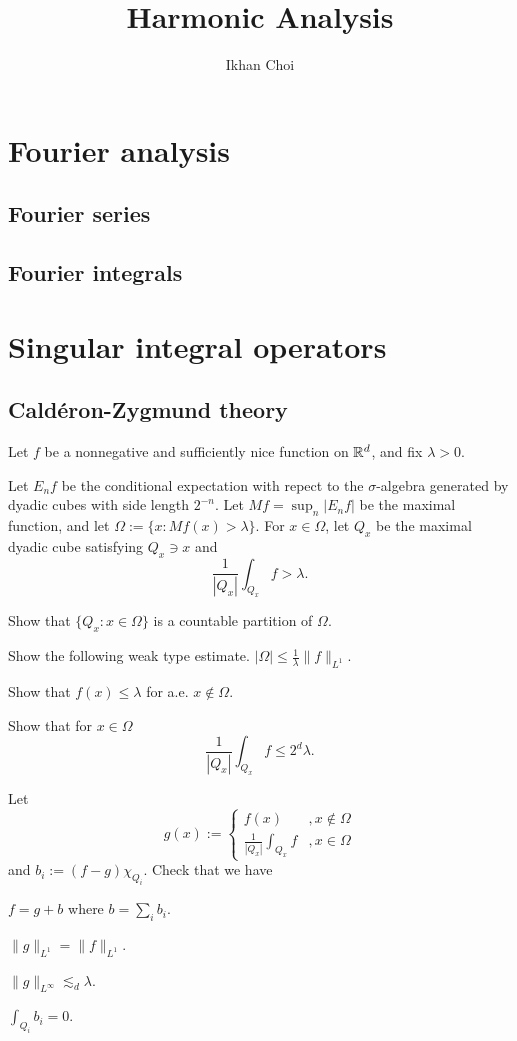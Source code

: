 \documentclass{../note}
\begin{document}
\title{Harmonic Analysis}
\author{Ikhan Choi}
\maketitle
\tableofcontents

\part{Fourier analysis}
\chapter{Fourier series}
\chapter{Fourier integrals}


\part{Singular integral operators}
\chapter{Cald\'eron-Zygmund theory}

Let $f$ be a nonnegative and sufficiently nice function on $\mathbb{R}^d$, and fix $\lambda>0$.

\begin{prb}
Let $E_nf$ be the conditional expectation with repect to the $\sigma$-algebra generated by dyadic cubes with side length $2^{-n}$.
Let $Mf=\sup_n|E_nf|$ be the maximal function, and let $\Omega:=\{x:Mf(x)>\lambda\}$.
For $x\in\Omega$, let $Q_x$ be the maximal dyadic cube satisfying $Q_x\ni x$ and
\[\frac1{|Q_x|}\int_{Q_x}f>\lambda.\]
\begin{parts}
\item
Show that $\{Q_x:x\in\Omega\}$ is a countable partition of $\Omega$.
\item
Show the following weak type estimate. $|\Omega|\le\frac1\lambda\|f\|_{L^1}$.
\item
Show that $f(x)\le\lambda$ for a.e. $x\notin\Omega$.
\item
Show that for $x\in\Omega$
\[\frac1{|Q_x|}\int_{Q_x}f\le2^d\lambda.\]
\end{parts}
\end{prb}

\begin{prb}
Let
\[g(x):=\begin{cases}f(x)&,x\notin\Omega\\\frac1{|Q_x|}\int_{Q_x}f&,x\in\Omega\end{cases}\]
and $b_i:=(f-g)\chi_{Q_i}$.
Check that we have
\begin{parts}
\item $f=g+b$ where $b=\sum_ib_i$.
\item $\|g\|_{L^1}=\|f\|_{L^1}$.
\item $\|g\|_{L^\infty}\lesssim_d\lambda$.
\item $\int_{Q_i}b_i=0$.
\end{parts}
\end{prb}
\end{document}
